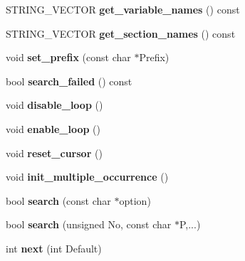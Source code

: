 \begin{DoxyCompactItemize}
\item 
\hypertarget{classGetPot_a811c7b5230512718ec8f82de6662f28f}{
STRING\_\-VECTOR {\bfseries get\_\-variable\_\-names} () const }
\label{classGetPot_a811c7b5230512718ec8f82de6662f28f}

\item 
\hypertarget{classGetPot_a2dfc532c29426f5010cc07f2f07a5ea3}{
STRING\_\-VECTOR {\bfseries get\_\-section\_\-names} () const }
\label{classGetPot_a2dfc532c29426f5010cc07f2f07a5ea3}

\item 
\hypertarget{classGetPot_a19e24ca540e9e72ea3a8a8780d950a22}{
void {\bfseries set\_\-prefix} (const char $\ast$Prefix)}
\label{classGetPot_a19e24ca540e9e72ea3a8a8780d950a22}

\item 
\hypertarget{classGetPot_a5d6af0d1618f40cb9d0acaba79931014}{
bool {\bfseries search\_\-failed} () const }
\label{classGetPot_a5d6af0d1618f40cb9d0acaba79931014}

\item 
\hypertarget{classGetPot_a84b0e0199ae3df63c01ea125a16be83f}{
void {\bfseries disable\_\-loop} ()}
\label{classGetPot_a84b0e0199ae3df63c01ea125a16be83f}

\item 
\hypertarget{classGetPot_a99f8e9cc6ff54d0abf4ef090cd39d8a7}{
void {\bfseries enable\_\-loop} ()}
\label{classGetPot_a99f8e9cc6ff54d0abf4ef090cd39d8a7}

\item 
\hypertarget{classGetPot_ad55107a9bd39804599844194218e8e3a}{
void {\bfseries reset\_\-cursor} ()}
\label{classGetPot_ad55107a9bd39804599844194218e8e3a}

\item 
\hypertarget{classGetPot_af8d29a623cd9a37d9f133c66b712efc5}{
void {\bfseries init\_\-multiple\_\-occurrence} ()}
\label{classGetPot_af8d29a623cd9a37d9f133c66b712efc5}

\item 
\hypertarget{classGetPot_a183e68216495d2afe4fb1d3a6363718d}{
bool {\bfseries search} (const char $\ast$option)}
\label{classGetPot_a183e68216495d2afe4fb1d3a6363718d}

\item 
\hypertarget{classGetPot_aba4993d981a043ea377eed1588f6da98}{
bool {\bfseries search} (unsigned No, const char $\ast$P,...)}
\label{classGetPot_aba4993d981a043ea377eed1588f6da98}

\item 
\hypertarget{classGetPot_ab198c8915bf041f409d021d947a63c8d}{
int {\bfseries next} (int Default)}
\label{classGetPot_ab198c8915bf041f409d021d947a63c8d}


\end{DoxyCompactItemize}
